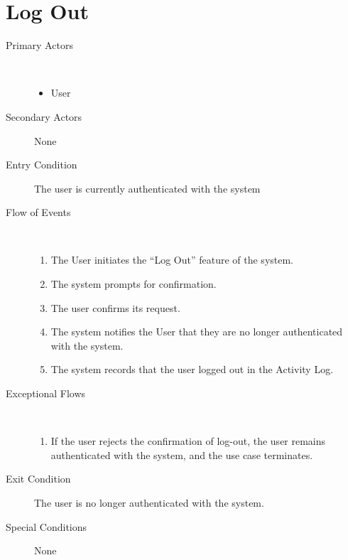 \documentclass[a4paper,10pt]{report}
\begin{document}
\section{Log Out}
\begin{description}
\item[Primary Actors] \
  \begin{itemize}
  \item User
  \end{itemize}
\item[Secondary Actors] None
\item[Entry Condition]
  The user is currently authenticated with the system
\item[Flow of Events] \
  \begin{enumerate}
  \item The User initiates the ``Log Out'' feature of the system. 
  \item The system prompts for confirmation.
  \item The user confirms its request.
  \item The system notifies the User that they are no longer authenticated with the system.
    \item The system records that the user logged out in the Activity Log.
  \end{enumerate}
\item[Exceptional Flows] \
  \begin{enumerate}
  \item If the user rejects the confirmation of log-out, the user remains authenticated with the system, and the use case terminates.
  \end{enumerate}
\item[Exit Condition]
  The user is no longer authenticated with the system.
\item[Special Conditions] None
\end{description}
\end{document}
